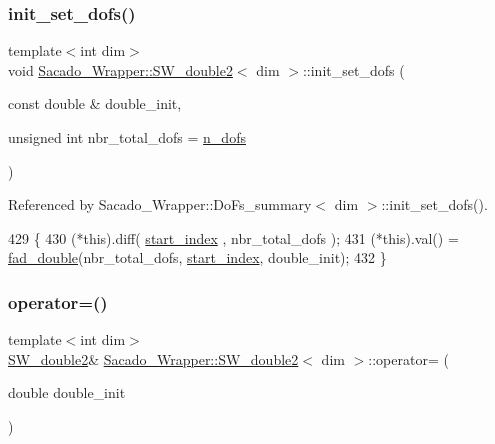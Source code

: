 \subsubsection{\texorpdfstring{init\+\_\+set\+\_\+dofs()}{init\_set\_dofs()}}
{\footnotesize\ttfamily template$<$int dim$>$ \\
void \hyperlink{classSacado__Wrapper_1_1SW__double2}{Sacado\+\_\+\+Wrapper\+::\+S\+W\+\_\+double2}$<$ dim $>$\+::init\+\_\+set\+\_\+dofs (\begin{DoxyParamCaption}\item[{const double \&}]{double\+\_\+init,  }\item[{unsigned int}]{nbr\+\_\+total\+\_\+dofs = {\ttfamily \hyperlink{classSacado__Wrapper_1_1SW__double2_a535aa77392e896e21151bfc63f92e020}{n\+\_\+dofs}} }\end{DoxyParamCaption})}



Referenced by Sacado\+\_\+\+Wrapper\+::\+Do\+Fs\+\_\+summary$<$ dim $>$\+::init\+\_\+set\+\_\+dofs().


\begin{DoxyCode}
429     \{
430         (*this).diff( \hyperlink{classSacado__Wrapper_1_1SW__double2_ae7327540ad1fd725ea78ffc2268b423a}{start\_index} , nbr\_total\_dofs );
431         (*this).val() = \hyperlink{Sacado__Wrapper_8h_a868b94676739e612d9c95940e70892a9}{fad\_double}(nbr\_total\_dofs, \hyperlink{classSacado__Wrapper_1_1SW__double2_ae7327540ad1fd725ea78ffc2268b423a}{start\_index}, double\_init);
432     \}
\end{DoxyCode}
\mbox{\label{classSacado__Wrapper_1_1SW__double2_a6f0538f891bd49efa54cc508da477f2e}} 
\subsubsection{\texorpdfstring{operator=()}{operator=()}\hspace{0.1cm}{\footnotesize\ttfamily [1/2]}}
{\footnotesize\ttfamily template$<$int dim$>$ \\
\hyperlink{classSacado__Wrapper_1_1SW__double2}{S\+W\+\_\+double2}\& \hyperlink{classSacado__Wrapper_1_1SW__double2}{Sacado\+\_\+\+Wrapper\+::\+S\+W\+\_\+double2}$<$ dim $>$\+::operator= (\begin{DoxyParamCaption}\item[{double}]{double\+\_\+init }\end{DoxyParamCaption})\hspace{0.3cm}{\ttfamily [inline]}}


